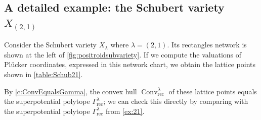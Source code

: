 \documentclass{amsart}
\theoremstyle{definition}
\numberwithin{equation}{section}
\newcommand{\conv}{\operatorname{Conv}}
\newcommand{\rect}{\mathrm{rec}}
\begin{document}
\subsection{A detailed example: the Schubert variety $X_{(2,1)}$}\label{sec:example}

Consider the Schubert variety $X_{\lambda}$  where $\lambda=(2,1)$.
Its rectangles network is shown at the left of 
\cref{fig:positroidsubvariety}.  If we compute the valuations of 
Pl\"ucker coordinates, expressed in this network chart, we obtain the 
lattice points shown in 
\cref{table:Schub21}.  

By
\cref{c:ConvEqualsGamma}, the convex hull  
$\conv_{\rect}^{\lambda}$ 
of these lattice points
equals the superpotential polytope $\Gamma_{\rect}^{\lambda}$; we 
can check this directly by comparing with 
the superpotential polytope 
$\Gamma_{\rect}^{\lambda}$
from 
\cref{ex:21}.
\end{document}
